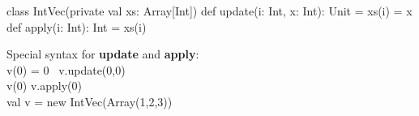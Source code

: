 \documentclass[article, a5paper]{memoir}
\newcommand{\Comment}[1]{{\color{commentgreen}{#1}}}
\begin{document}
{\vspace{-0.2em}\hspace{0.32em}\begin{minipage}{0.65\linewidth}%
{\small\begin{Code}[frame=none] %
class IntVec(private val xs: Array[Int]) {
  def update(i: Int, x: Int): Unit = { xs(i) = x }
  def apply(i: Int): Int = xs(i)
}
\end{Code}%
}%
\end{minipage}%
\hfill\begin{minipage}{0.32\linewidth}
\vspace{-0.5em}\raggedright{\small
Special syntax for \textbf{update} and \textbf{apply}: \\
v(0) = 0~\Comment{expanded to} v.update(0,0)\\
v(0)\hspace{1.5em}\Comment{expanded to} v.apply(0)\\
\Comment{where} val v = new IntVec(Array(1,2,3)) \\

}%
\end{minipage}

}
\end{document}
